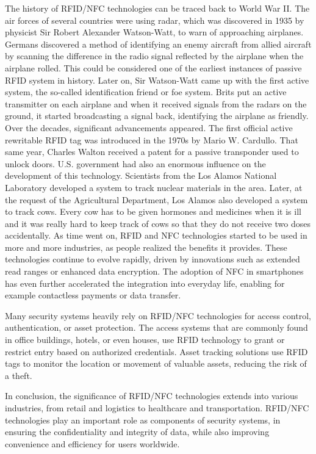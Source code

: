 The history of RFID/NFC technologies can be traced back to World War II. The air forces of several countries were using radar, which was discovered in 1935 by physicist Sir Robert Alexander Watson-Watt, to warn of approaching airplanes. Germans discovered a method of identifying an enemy aircraft from allied aircraft by scanning the difference in the radio signal reflected by the airplane when the airplane rolled. This could be considered one of the earliest instances of passive RFID system in history. Later on, Sir Watson-Watt came up with the first active system, the so-called identification friend or foe system. Brits put an active transmitter on each airplane and when it received signals from the radars on the ground, it started broadcasting a signal back, identifying the airplane as friendly. Over the decades, significant advancements appeared. The first official active rewritable RFID tag was introduced in the 1970s by Mario W. Cardullo. That same year, Charles Walton received a patent for a passive transponder used to unlock doors. U.S. government had also an enormous influence on the development of this technology. Scientists from the Los Alamos National Laboratory developed a system to track nuclear materials in the area. Later, at the request of the Agricultural Department, Los Alamos also developed a system to track cows. Every cow has to be given hormones and medicines when it is ill and it was really hard to keep track of cows so that they do not receive two doses accidentally. \cite{violino2005history} As time went on, RFID and NFC technologies started to be used in more and more industries, as people realized the benefits it provides. These technologies continue to evolve rapidly, driven by innovations such as extended read ranges or enhanced data encryption. The adoption of NFC in smartphones has even further accelerated the integration into everyday life, enabling for example contactless payments or data transfer.

Many security systems heavily rely on RFID/NFC technologies for access control, authentication, or asset protection. The access systems that are commonly found in office buildings, hotels, or even houses, use RFID technology to grant or restrict entry based on authorized credentials. Asset tracking solutions use RFID tags to monitor the location or movement of valuable assets, reducing the risk of a theft.

In conclusion, the significance of RFID/NFC technologies extends into various industries, from retail and logistics to healthcare and transportation. RFID/NFC technologies play an important role as components of security systems, in ensuring the confidentiality and integrity of data, while also improving convenience and efficiency for users worldwide.
